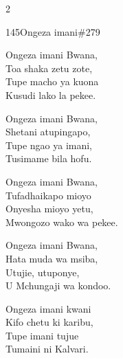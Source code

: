 \documentclass{article}
\begin{document}
\begin{multicols}{2}
\begin{hymn}{145}{Ongeza imani}{\#279}
\begin{stanza}
Ongeza imani Bwana,\\
Toa shaka zetu zote,\\
Tupe macho ya kuona\\
Kusudi lako la pekee.
\end{stanza}
\begin{stanza}
Ongeza imani Bwana,\\
Shetani atupingapo,\\
Tupe ngao ya imani,\\
Tusimame bila hofu.
\end{stanza}
\begin{stanza}
Ongeza imani Bwana,\\
Tufadhaikapo mioyo\\
Onyesha mioyo yetu,\\
Mwongozo wako wa pekee.
\end{stanza}
\begin{stanza}
Ongeza imani Bwana,\\
Hata muda wa msiba,\\
Utujie, utuponye,\\
U Mchungaji wa kondoo.
\end{stanza}
\begin{stanza}
Ongeza imani kwani\\
Kifo chetu ki karibu,\\
Tupe imani tujue\\
Tumaini ni Kalvari.
\end{stanza}
\end{hymn}


\end{multicols}
\end{document}
